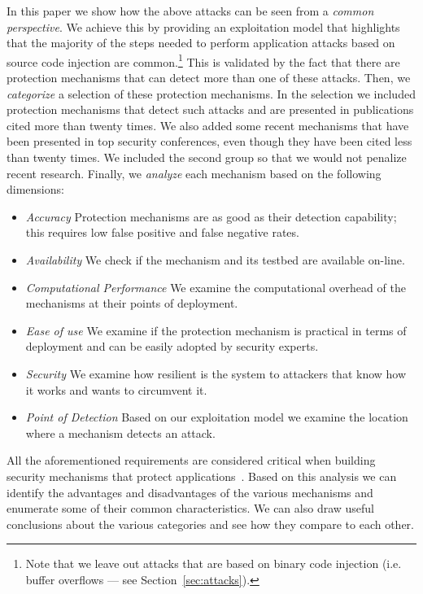 \documentclass[conference]{IEEEtran}
\begin{document}
In this paper we show how the above attacks can be seen from a {\it
  common perspective}. We achieve this by providing an exploitation
model that highlights that the majority of the steps needed to perform
application attacks based on source code injection are
common.\footnote{Note that we leave out attacks that are based on
  binary code injection (i.e. buffer overflows --- see
  Section~\ref{sec:attacks}).} This is validated by the fact that
there are protection mechanisms that can detect more than one of these
attacks. Then, we {\it categorize} a selection of these protection
mechanisms. In the selection we included protection mechanisms that
detect such attacks and are presented in publications cited more than
twenty times. We also added some recent mechanisms that have been
presented in top security conferences, even though they have been
cited less than twenty times. We included the second group so that we
would not penalize recent research. Finally, we {\it analyze} each
mechanism based on the following dimensions:
\begin{itemize}
\item {\it Accuracy} Protection mechanisms are as good
  as their detection capability; this requires low false positive and
  false negative rates.
\item {\it Availability} We check if the mechanism and its
  testbed are available on-line.
\item {\it Computational Performance} We examine the computational
  overhead of the mechanisms at their points of deployment.
\item {\it Ease of use} We examine if the protection
  mechanism is practical in terms of deployment
  and can be easily adopted by security experts.
\item {\it Security} We examine how resilient is the system to
  attackers that know how it works and wants to circumvent it.
\item {\it Point of Detection} Based on our exploitation model
  we examine the location where a mechanism detects an attack.
\end{itemize}

\noindent
All the aforementioned requirements are considered critical
when building security mechanisms that protect
applications~\cite{A01,A00,SPWS13,nature2014}.
Based on this analysis we can identify the advantages
and disadvantages of the
various mechanisms and enumerate some of their common
characteristics. We can also draw useful conclusions
about the various categories and see how they compare
to each other.
\end{document}
